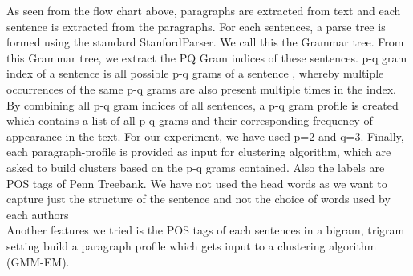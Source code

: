 \documentclass[letterpaper]{article}
\begin{document}
As seen from the flow chart above, paragraphs are extracted from text and each sentence is extracted from the paragraphs. For each sentences, a parse tree is formed using the standard StanfordParser. We call this the Grammar tree. From this Grammar tree, we extract the PQ Gram indices of these sentences. p-q gram index of a sentence is all possible p-q grams of a sentence , whereby multiple occurrences of the same p-q grams are also present multiple times in the index. By combining all p-q gram indices of all sentences, a p-q gram profile is created which contains a list of all p-q grams and their corresponding frequency of appearance in the text.
For our experiment, we have used p=2 and q=3. Finally, each paragraph-profile is provided as input for clustering algorithm, which are asked to build clusters based on the p-q grams contained. Also the labels are POS tags of Penn Treebank. We have not used the head words as we want to capture just the structure of the sentence and not the choice of words used by each authors\\
Another features we tried is the POS tags of each sentences in a bigram, trigram setting build a paragraph profile which gets input to a clustering algorithm (GMM-EM).
\end{document}
